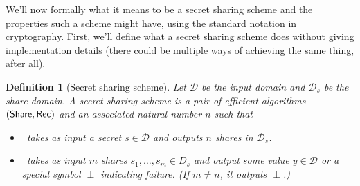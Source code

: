 \documentclass[12 pt]{article}
\newtheorem{definition}{Definition}
\def\D{\ensuremath{\mathcal{D}}}
\def\bin{\ensuremath{\{0, 1\}}}
\newcounter{example}[section]
\begin{document}
We'll now formally what it means to be a secret sharing scheme and the 
properties such a scheme might have, using the standard notation in 
cryptography. First, we'll define what a secret sharing scheme 
does without giving implementation details (there could be multiple ways 
of achieving the same thing, after all). 

\begin{definition}[Secret sharing scheme]\label{def:ss}
    Let $\D$ be the input domain and $\D_s$ be the share domain.
    A secret sharing scheme is a pair of efficient algorithms $(\mathsf{Share}, \mathsf{Rec})$
    and an associated natural number $n$ such that

    \begin{itemize}
        \item \share~takes as input a secret $s \in \D$ and outputs $n$ 
        shares in $\D_s$.
        \item \rec~takes as input $m$ shares $s_1, \ldots, s_m \in D_s$ 
        and output some value $y \in \D$ or a special symbol $\perp$ 
        indicating failure. (If $m \neq n$, it outputs $\perp$.)
    \end{itemize}
\end{definition}


\end{document}
